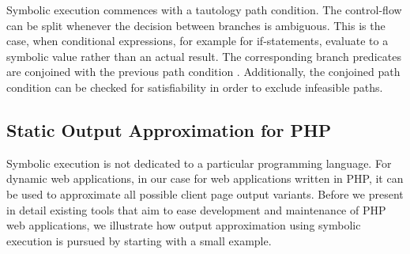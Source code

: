 \documentclass[sigconf, preprint]{acmart}
\begin{document}
Symbolic execution commences with a tautology path condition. The control-flow
can be split whenever the decision between branches is ambiguous. This is the
case, when conditional expressions, for example for if-statements, evaluate to
a symbolic value rather than an actual result. The corresponding branch
predicates are conjoined with the previous path condition \cite{King1976}.
Additionally, the conjoined path condition can be checked for satisfiability in
order to exclude infeasible paths.


\subsection{Static Output Approximation for PHP} \label{sec:workflow}
Symbolic execution is not dedicated to a particular
programming language. For dynamic web applications, in our case for web
applications written in PHP, it can be used to approximate all possible client
page output variants. Before we present in detail existing tools that aim to
ease development and maintenance of PHP web applications, we illustrate how output
approximation using symbolic execution is pursued by starting with a small
example.
\end{document}
